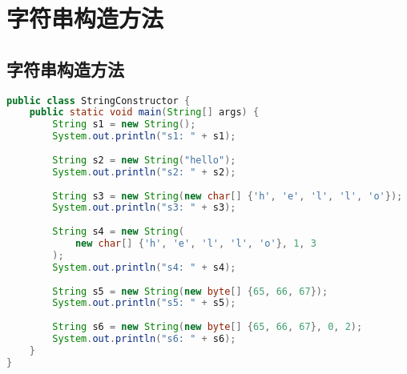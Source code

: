 \section{字符串构造方法}

\subsection{字符串构造方法}

\begin{table}[H]
	\centering
	\caption{字符串构造方法}
\end{table}


\begin{lstlisting}[language=Java]
public class StringConstructor {
    public static void main(String[] args) {
        String s1 = new String();
        System.out.println("s1: " + s1);
        
        String s2 = new String("hello");
        System.out.println("s2: " + s2);
        
        String s3 = new String(new char[] {'h', 'e', 'l', 'l', 'o'});
        System.out.println("s3: " + s3);
        
        String s4 = new String(
            new char[] {'h', 'e', 'l', 'l', 'o'}, 1, 3
        );
        System.out.println("s4: " + s4);
        
        String s5 = new String(new byte[] {65, 66, 67});
        System.out.println("s5: " + s5);
        
        String s6 = new String(new byte[] {65, 66, 67}, 0, 2);
        System.out.println("s6: " + s6);
    }
}
\end{lstlisting}

